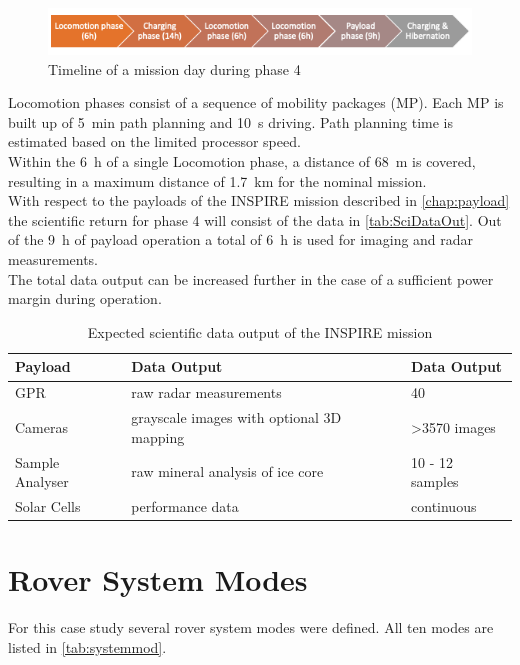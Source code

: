 \begin{figure}[htb]
  \includegraphics[width=1.0\textwidth]{Media/Timeline_day.png}
  \caption{Timeline of a mission day during phase 4}
  \label{fig:timeline-day}
\end{figure}


Locomotion phases consist of a sequence of mobility packages (MP). Each MP is built up of 5~min path planning and 10~s driving. Path planning time is estimated based on the limited processor speed. \\
Within the 6~h of a single Locomotion phase, a distance of 68~m is covered, resulting in a maximum distance of 1.7~km for the nominal mission.  \\

With respect to the payloads of the INSPIRE mission described in \autoref{chap:payload} the scientific return for phase 4 will consist of the data in \autoref{tab:SciDataOut}. Out of the 9~h of payload operation a total of 6~h is used for imaging and radar measurements. \\
The total data output can be increased further in the case of a sufficient power margin during operation.

\begin{table}[h]
\centering
\caption{Expected scientific data output of the INSPIRE mission }
\begin{tabular}{lll}
\toprule
Payload         & Data Output                               & Data Output     \\ 
\midrule
GPR             & raw radar measurements                    & 40              \\
Cameras         & grayscale images with optional 3D mapping & >3570 images     \\
Sample Analyser & raw mineral analysis of ice core          & 10 - 12 samples \\
Solar Cells     & performance data                          & continuous      \\ 
\bottomrule
\end{tabular}
\label{tab:SciDataOut}
\end{table}

  
\section{Rover System Modes}
\label{chap:rovsubmod}
For this case study several rover system modes were defined. All ten modes are listed in \autoref{tab:systemmod}. 

